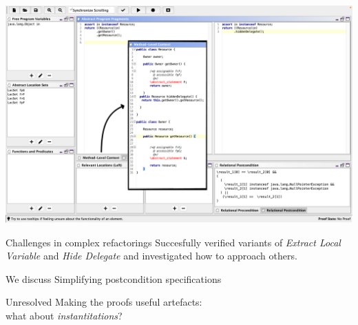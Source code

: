 \begin{frame}\vspace*{-5mm}
\begin{center}
\includegraphics[scale=.25]{screenshots/HideDelegateAbstract}
\end{center}
\end{frame}

\begin{frame}{Challenges in complex refactorings}
  Succesfully verified variants of \textit{Extract Local Variable} and \textit{Hide Delegate} and investigated how to approach others.
  \begin{block}{We discuss}
  Simplifying postcondition specifications
  \end{block}
  \begin{block}{Unresolved}
    Making the proofs useful artefacts:\\
    what about \emph{instantitations}?
  \end{block}
\end{frame}

